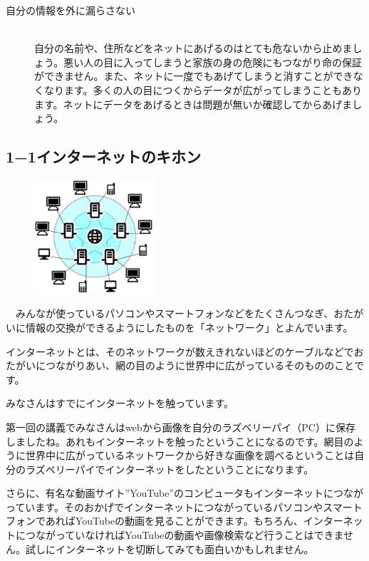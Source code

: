 \documentclass[a4paper,12pt,dvipdfmx]{jarticle}
\begin{document}
\begin{description}
\item[自分の情報を外に漏らさない]~\\
自分の名前や、住所などをネットにあげるのはとても危ないから止めましょう。悪い人の目に入ってしまうと家族の身の危険にもつながり命の保証ができません。また、ネットに一度でもあげてしまうと消すことができなくなります。多くの人の目につくからデータが広がってしまうこともあります。ネットにデータをあげるときは問題が無いか確認してからあげましょう。
\end{description}

\clearpage\subsection*{1−1インターネットのキホン}
\begin{figure}
\includegraphics[width=0.4\textwidth]{ome7-img002.eps}
\end{figure}
　みんなが使っているパソコンやスマートフォンなどをたくさんつなぎ、おたがいに情報の交換ができるようにしたものを「ネットワーク」とよんでいます。

インターネットとは、そのネットワークが数えきれないほどのケーブルなどでおたがいにつながりあい、網の目のように世界中に広がっているそのもののことです。



\bigskip

みなさんはすでにインターネットを触っています。

第一回の講義でみなさんはwebから画像を自分のラズベリーパイ（PC）に保存しましたね。あれもインターネットを触ったということになるのです。網目のように世界中に広がっているネットワークから好きな画像を調べるということは自分のラズベリーパイでインターネットをしたということになります。

さらに、有名な動画サイト”YouTube”のコンピュータもインターネットにつながっています。そのおかげでインターネットにつながっているパソコンやスマートフォンであればYouTubeの動画を見ることができます。もちろん、インターネットにつながっていなければYouTubeの動画や画像検索など行うことはできません。試しにインターネットを切断してみても面白いかもしれません。
\end{document}
